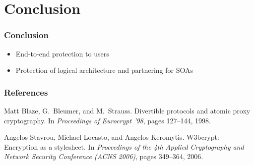 \documentclass{beamer}
\begin{document}
\section{Conclusion}
\begin{frame}
\frametitle{Conclusion}
\begin{itemize}
\item End-to-end protection to users 
\item Protection of logical architecture and partnering for SOAs
\end{itemize}
\end{frame}

\begin{frame}
\frametitle{References}
\begin{thebibliography}{10}

Matt Blaze, G.~Bleumer, and M.~Strauss.
\newblock Divertible protocols and atomic proxy cryptography.
\newblock In {\em Proceedings of Eurocrypt '98}, pages 127--144, 1998.

Angelos Stavrou, Michael Locasto, and Angelos Keromytis.
\newblock W3bcrypt: Encryption as a stylesheet.
\newblock In {\em Proceedings of the 4th Applied Cryptography and Network
  Security Conference (ACNS 2006)}, pages 349--364, 2006.
\end{thebibliography}
\end{frame}
\end{document}
